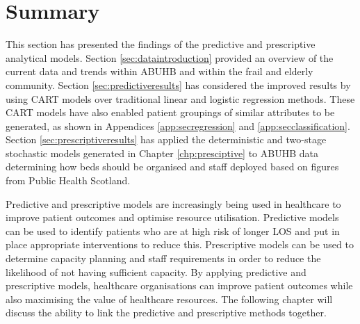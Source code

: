 \documentclass[../thesis.tex]{subfiles}
\begin{document}
\section{Summary}
This section has presented the findings of the predictive and prescriptive analytical models. Section \ref{sec:dataintroduction} provided an overview of the current data and trends within ABUHB and within the frail and elderly community. Section \ref{sec:predictiveresults} has considered the improved results by using CART models over traditional linear and logistic regression methods. These CART models have also enabled patient groupings of similar attributes to be generated, as shown in Appendices \ref{app:secregression} and \ref{app:secclassification}. Section \ref{sec:prescriptiveresults} has applied the deterministic and two-stage stochastic models generated in Chapter \ref{chp:presciptive} to ABUHB data determining how beds should be organised and staff deployed based on figures from Public Health Scotland.

Predictive and prescriptive models are increasingly being used in healthcare to improve patient outcomes and optimise resource utilisation. Predictive models can be used to identify patients who are at high risk of longer LOS and put in place appropriate interventions to reduce this. Prescriptive models can be used to determine capacity planning and staff requirements in order to reduce the likelihood of not having sufficient capacity. By applying predictive and prescriptive models, healthcare organisations can improve patient outcomes while also maximising the value of healthcare resources. The following chapter will discuss the ability to link the predictive and prescriptive methods together.
\end{document}
